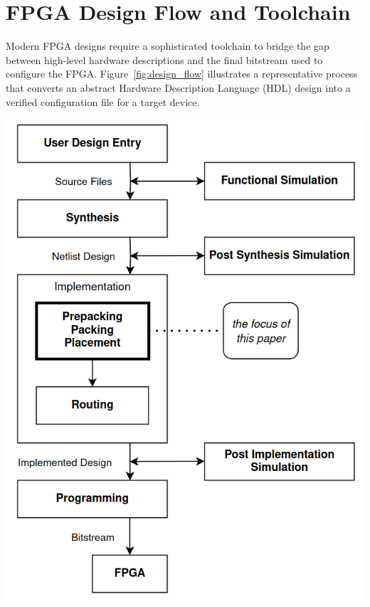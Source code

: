 
\section{FPGA Design Flow and Toolchain}
\label{sec:fpga_flow_toolchain}

Modern FPGA designs require a sophisticated toolchain to bridge the gap between high-level hardware descriptions and the final bitstream used to configure the FPGA. 
Figure~\ref{fig:design_flow} illustrates a representative process that converts an abstract Hardware Description Language (HDL) design into a verified configuration file for a target device.

{
    \centering
    \includegraphics[width=0.9\columnwidth]{figures/design_flow.png}
    \label{fig:design_flow}
}


